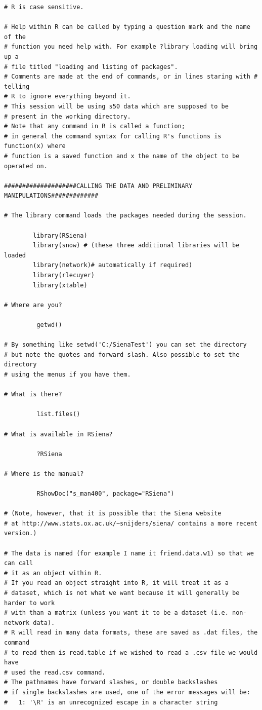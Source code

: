 \documentclass[a4paper,fleqn]{article}
\newcommand{\+}{\, + \,}
\newcommand{\R}{{\sf R }}
\begin{document}
{\begin{verbatim}
# R is case sensitive.

# Help within R can be called by typing a question mark and the name of the
# function you need help with. For example ?library loading will bring up a
# file titled "loading and listing of packages".
# Comments are made at the end of commands, or in lines staring with # telling
# R to ignore everything beyond it.
# This session will be using s50 data which are supposed to be
# present in the working directory.
# Note that any command in R is called a function;
# in general the command syntax for calling R's functions is function(x) where
# function is a saved function and x the name of the object to be operated on.

####################CALLING THE DATA AND PRELIMINARY MANIPULATIONS#############

# The library command loads the packages needed during the session.

        library(RSiena)
        library(snow) # (these three additional libraries will be loaded
        library(network)# automatically if required)
        library(rlecuyer)
        library(xtable)

# Where are you?

         getwd()

# By something like setwd('C:/SienaTest') you can set the directory
# but note the quotes and forward slash. Also possible to set the directory
# using the menus if you have them.

# What is there?

         list.files()

# What is available in RSiena?

         ?RSiena

# Where is the manual?

         RShowDoc("s_man400", package="RSiena")

# (Note, however, that it is possible that the Siena website
# at http://www.stats.ox.ac.uk/~snijders/siena/ contains a more recent version.)

# The data is named (for example I name it friend.data.w1) so that we can call
# it as an object within R.
# If you read an object straight into R, it will treat it as a
# dataset, which is not what we want because it will generally be harder to work
# with than a matrix (unless you want it to be a dataset (i.e. non-network data).
# R will read in many data formats, these are saved as .dat files, the command
# to read them is read.table if we wished to read a .csv file we would have
# used the read.csv command.
# The pathnames have forward slashes, or double backslashes
# if single backslashes are used, one of the error messages will be:
#   1: '\R' is an unrecognized escape in a character string



\end{verbatim}}
\end{document}
